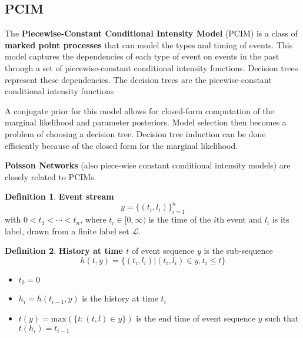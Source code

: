 \documentclass[12pt]{article}
\theoremstyle{plain}
\theoremstyle{definition}
\newtheorem{definition}{Definition}
\theoremstyle{remark}
\begin{document}
\subsection{PCIM}

  The \textbf{Piecewise-Constant Conditional Intensity Model} (PCIM) is a class
  of \textbf{marked point processes} that can model the types and timing of
  events.
  This model captures the dependencies of each type of event on events in the
  past through a set of piecewise-constant conditional intensity functions.
  Decision trees represent these dependencies. The decision trees are the
  picewise-constant conditional intensity functions \citep{gunmeexu11}

  A conjugate prior for this model allows for closed-form computation of the
  marginal likelihood and parameter posteriors.
  Model selection then becomes a problem of choosing a decision tree.
  Decision tree induction can be done efficiently because of the closed form for
  the marginal likelihood.

  \textbf{Poisson Networks} \citep{rajgraher05} (also piece-wise constant
  conditional intensity models) are closely related to PCIMs.

\begin{definition}
  \textbf{Event stream}
\begin{equation*}
  y = \{(t_i,l_i)\}_{i=1}^n
\end{equation*}
with $0 < t_1 < \cdots < t_n$, where $t_i \in [0, \infty)$ is the time of the
$i$th event and $l_i$ is its label, drawn from a finite label set $\mathcal{L}$.
\end{definition}

\begin{definition}
  \textbf{History at time $t$} of event sequence $y$ is the sub-sequence
\begin{equation*}
  h(t,y) = \{(t_i,l_i)|(t_i,l_i) \in y,t_i \leq t\}
\end{equation*}
\begin{itemize}
  \item $t_0 = 0$
  \item $h_i = h(t_{i-1},y)$ is the history at time $t_i$
  \item $t(y) = \mathrm{max}(\{t:(t,l) \in y\})$ is the end time of event
    sequence $y$ such that $t(h_i) = t_{i-1}$
\end{itemize}
\end{definition}
\end{document}
